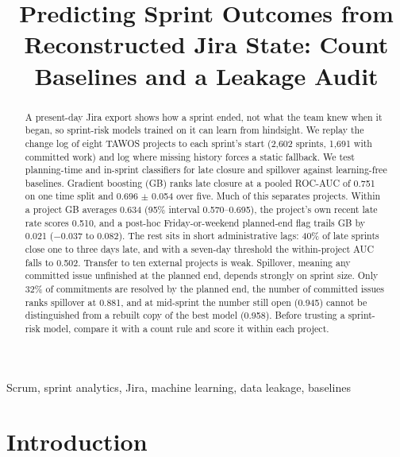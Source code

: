 \documentclass[conference]{IEEEtran}
\begin{document}
\title{Predicting Sprint Outcomes from Reconstructed Jira State: Count Baselines and a Leakage Audit}
\author{
\and
{}
}
\date{}
\maketitle

\begin{abstract}
A present-day Jira export shows how a sprint ended, not what the team knew when it began, so sprint-risk models trained on it can learn from hindsight. We replay the change log of eight TAWOS projects to each sprint's start (2,602 sprints, 1,691 with committed work) and log where missing history forces a static fallback. We test planning-time and in-sprint classifiers for late closure and spillover against learning-free baselines. Gradient boosting (GB) ranks late closure at a pooled ROC-AUC of 0.751 on one time split and 0.696 $\pm$ 0.054 over five. Much of this separates projects. Within a project GB averages 0.634 (95\% interval 0.570--0.695), the project's own recent late rate scores 0.510, and a post-hoc Friday-or-weekend planned-end flag trails GB by 0.021 ($-0.037$ to 0.082). The rest sits in short administrative lags: 40\% of late sprints close one to three days late, and with a seven-day threshold the within-project AUC falls to 0.502. Transfer to ten external projects is weak. Spillover, meaning any committed issue unfinished at the planned end, depends strongly on sprint size. Only 32\% of commitments are resolved by the planned end, the number of committed issues ranks spillover at 0.881, and at mid-sprint the number still open (0.945) cannot be distinguished from a rebuilt copy of the best model (0.958). Before trusting a sprint-risk model, compare it with a count rule and score it within each project.
\end{abstract}

\begin{IEEEkeywords}
Scrum, sprint analytics, Jira, machine learning, data leakage, baselines
\end{IEEEkeywords}

\section{Introduction}
\end{document}
